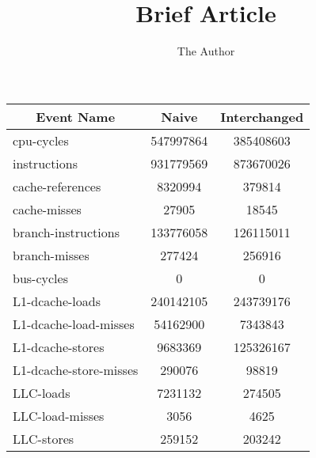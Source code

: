 \documentclass[11pt, oneside]{article}   	%
\title{Brief Article}
\author{The Author}
\begin{document}
\maketitle

\begin{table}[]
\centering
\label{my-label}
\begin{tabular}{|l|c|c|}
\hline
\multicolumn{1}{|c|}{\textbf{Event Name}} & \textbf{Naive} & \textbf{Interchanged} \\ \hline
cpu-cycles                                & 547997864      & 385408603             \\ \hline
instructions                              & 931779569      & 873670026             \\ \hline
cache-references                          & 8320994        & 379814                \\ \hline
cache-misses                              & 27905          & 18545                 \\ \hline
branch-instructions                       & 133776058      & 126115011             \\ \hline
branch-misses                             & 277424         & 256916                \\ \hline
bus-cycles                                & 0              & 0                     \\ \hline
L1-dcache-loads                           & 240142105      & 243739176             \\ \hline
L1-dcache-load-misses                     & 54162900       & 7343843               \\ \hline
L1-dcache-stores                          & 9683369        & 125326167             \\ \hline
L1-dcache-store-misses                    & 290076         & 98819                 \\ \hline
LLC-loads                                 & 7231132        & 274505                \\ \hline
LLC-load-misses                           & 3056           & 4625                  \\ \hline
LLC-stores                                & 259152         & 203242                \\ \hline

\end{tabular}
\end{table}
\end{document}
